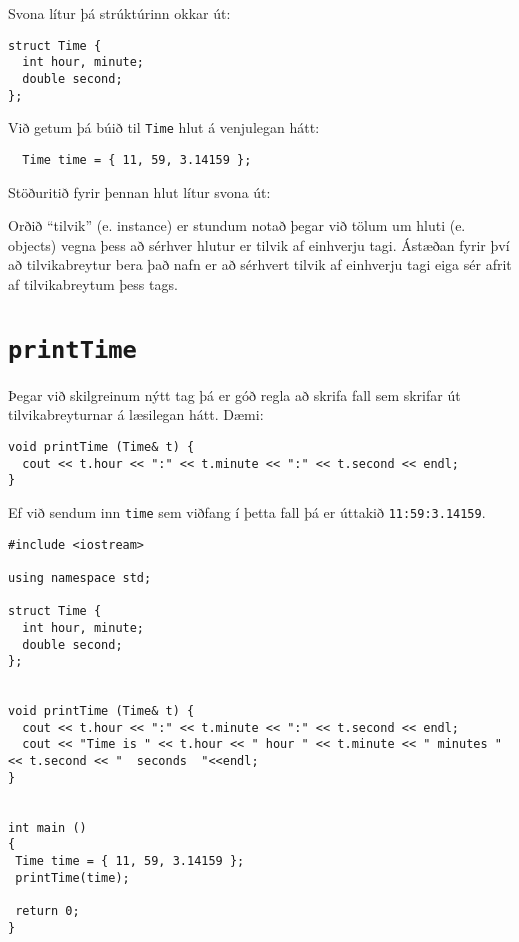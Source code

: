 Svona lítur þá strúktúrinn okkar út: 

\begin{verbatim}
struct Time {
  int hour, minute;
  double second;
};
\end{verbatim}
%
Við getum þá búið til {\tt Time} hlut á venjulegan hátt: 

\begin{verbatim}
  Time time = { 11, 59, 3.14159 };
\end{verbatim}
%
Stöðuritið fyrir þennan hlut lítur svona út:

\vspace{0.1in}
\centerline{}
\vspace{0.1in}

Orðið ``tilvik'' (e. instance) er stundum notað þegar við tölum um hluti (e. objects) vegna þess að sérhver hlutur er tilvik af einhverju tagi.
Ástæðan fyrir því að tilvikabreytur bera það nafn er að sérhvert tilvik af einhverju tagi eiga sér afrit af tilvikabreytum þess tags.

\section{{\tt printTime}}
\label{printobject}

Þegar við skilgreinum nýtt tag þá er góð regla að skrifa fall sem skrifar út tilvikabreyturnar á læsilegan hátt.
Dæmi:

\begin{verbatim}
void printTime (Time& t) {
  cout << t.hour << ":" << t.minute << ":" << t.second << endl;
}
\end{verbatim}
%
Ef við sendum inn {\tt time} sem viðfang í þetta fall þá er úttakið {\tt 11:59:3.14159}.

\begin{verbatim}
#include <iostream>

using namespace std;

struct Time {
  int hour, minute;
  double second;
};


void printTime (Time& t) {
  cout << t.hour << ":" << t.minute << ":" << t.second << endl;
  cout << "Time is " << t.hour << " hour " << t.minute << " minutes " << t.second << "  seconds  "<<endl;
}


int main ()
{
 Time time = { 11, 59, 3.14159 };
 printTime(time);
 
 return 0;
}
\end{verbatim}
%

